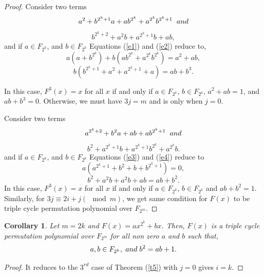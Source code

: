 \documentclass[12pt,a4paper]{article}
\newtheorem{corollary}{Corollary}[section]
\begin{document}
\begin{proof}
	Consider two terms
	\begin{equation}\label{e1}
		a^{2}+b^{2^{k}+1}a+ab^{2^{k}}+a^{2^{k}}b^{2^{k}+1}\hspace{.2cm}and
	\end{equation}
	\begin{equation}\label{e2}
		b^{2^{k}+2}+a^{2}b+a^{2^{k}+1}b+ab,
	\end{equation}
	and if $ a\in F_{2^{k}} $, and $ b\in F_{2^{k}} $ Equations (\ref{e1}) and (\ref{e2}) reduce to, 
	\begin{equation}
		a(a+b^{2^{k}})+b(ab^{2^{k}}+a^{2^{k}}b^{2^{k}})=a^{2}+ab,
	\end{equation}
	\begin{equation}
		b(b^{2^{k}+1}+a^{2}+a^{2^{k}+1}+a)=ab+b^{3}.
	\end{equation}
	
	In this case, $ F^{3}(x)=x $ for all $ x $ if and only if $ a\in F_{2^{k}} $, $ b\in F_{2^{k}} $, $ a^{2}+ab=1 $, and $ ab+b^{3}=0 $.
	Otherwise, we must have $ 3j=m $ and is only when $ j=0 $.
	
	Consider two terms 
	\begin{equation}\label{e3}
		a^{2^{k}+2}+b^{2}a+ab+ab^{2^{k}+1}\hspace{.2cm} and
	\end{equation}
	\begin{equation}\label{e4}
		b^{2}+a^{2^{k}+1}b+a^{2^{k}+1}b^{2^{k}}+a^{2^{k}}b.
	\end{equation}
	and if $ a\in F_{2^{k}} $, and $ b\in F_{2^{k}} $ Equations (\ref{e3}) and (\ref{e4}) reduce to
	\begin{equation}
		a(a^{2^{k}+1}+b^{2}+b+b^{2^{k}+1})=0,
	\end{equation}
	\begin{equation}
		b^{2}+a^{2}b+a^{2}b+ab=ab+b^{2}.
	\end{equation}
	In this case, $ F^{3}(x)=x $ for all $ x $ if and only if $ a\in F_{2^{k}} $, $ b\in F_{2^{k}} $ and $ ab+b^{2}=1 $.
	Similarly, for  $ 3j\equiv2i+j(\mod m) $, we get same condition for $ F(x) $ to be triple cycle permutation polynomial over $ F_{2^{m}} $.
\end{proof}
\begin{corollary}
	Let $ m=2k $ and $ F(x)=ax^{2^{k}}+bx $. Then, $ F(x) $ is a triple cycle permutation polynomial over $ F_{2^{m}} $ for all non zero $ a$ and $b $ such that, 
	\begin{equation}
		a,b\in F_{2^{k}},\hspace{0.1cm} and \hspace{0.1cm} b^{2}=ab+1.	 
	\end{equation}
\end{corollary}
\begin{proof}
	It reduces to the $3^{rd}$ case of Theorem (\ref{t5}) with $ j=0 $ gives $ i=k $. 
\end{proof}	
\end{document}
